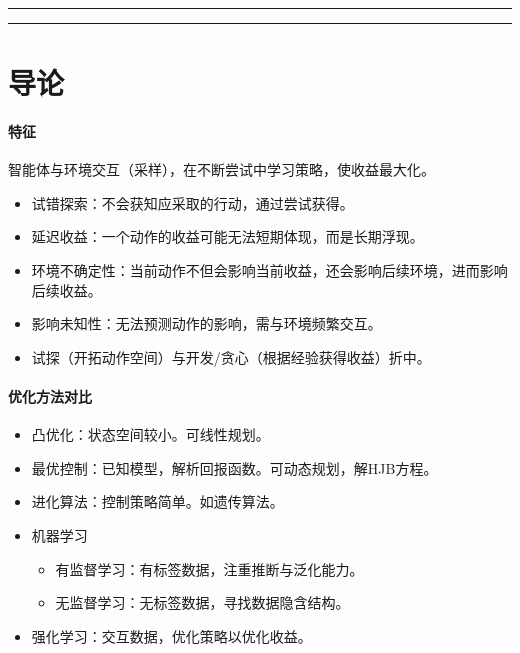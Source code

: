 \documentclass[
12pt, %
a4paper, 
oneside, %
headinclude,footinclude, %
]{scrartcl}
\title{\normalfont\spacedallcaps{强化学习}}
\date{}
\begin{document}
\maketitle
\newpage
\hypertarget{toc}{}
\begingroup
\begin{multicols}{2}
\tableofcontents
\end{multicols}
\endgroup
\newpage
\begingroup
\begin{multicols}{2}
\listoffigures
\end{multicols}
\endgroup
\hrule
\begingroup
\begin{multicols}{2}
\listoftables
\end{multicols}
\endgroup
\hrule
\begingroup
\begin{multicols}{2}
\listofalgorithms
\end{multicols}
\endgroup
\newpage
\listoftips
\newpage
\section{导论}
\paragraph{特征}
智能体与环境交互（采样），在不断尝试中学习策略，使收益最大化。
\begin{itemize}
\item 试错探索：不会获知应采取的行动，通过尝试获得。
\item 延迟收益：一个动作的收益可能无法短期体现，而是长期浮现。
\item 环境不确定性：当前动作不但会影响当前收益，还会影响后续环境，进而影响后续收益。
\item 影响未知性：无法预测动作的影响，需与环境频繁交互。
\item 试探（开拓动作空间）与开发/贪心（根据经验获得收益）折中。
\end{itemize}
\paragraph{优化方法对比}
\begin{itemize}
\item 凸优化：状态空间较小。可线性规划。
\item 最优控制：已知模型，解析回报函数。可动态规划，解HJB方程。
\item 进化算法：控制策略简单。如遗传算法。
\item 机器学习
\begin{itemize}
\item 有监督学习：有标签数据，注重推断与泛化能力。
\item 无监督学习：无标签数据，寻找数据隐含结构。
\end{itemize}
\item 强化学习：交互数据，优化策略以优化收益。
\end{itemize}
\end{document}
